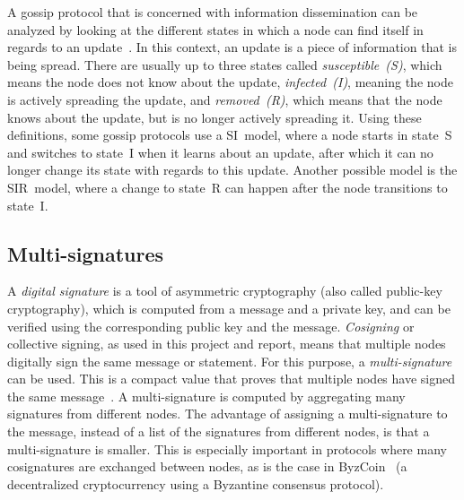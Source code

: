 A gossip protocol that is concerned with information dissemination can be analyzed by looking at the different states in which a node can find itself in regards to an update~\cite{Jela13}.
In this context, an update is a piece of information that is being spread. There are usually up to three states called \emph{susceptible~(S)}, which means the node does not know about the update, \emph{infected~(I)}, meaning the node is actively spreading the update, and \emph{removed~(R)}, which means that the node knows about the update, but is no longer actively spreading it.
Using these definitions, some gossip protocols use a SI~model, where a node starts in state~S and switches to state~I when it learns about an update, after which it can no longer change its state with regards to this update. Another possible model is the SIR~model, where a change to state~R can happen after the node transitions to state~I.

\subsection{Multi-signatures}

A \emph{digital signature} is a tool of asymmetric cryptography (also called public-key cryptography), which is computed from a message and a private key, and can be verified using the corresponding public key and the message.
\emph{Cosigning} or collective signing, as used in this project and report, means that multiple nodes digitally sign the same message or statement.
For this purpose, a \emph{multi-signature} can be used. This is a compact value that proves that multiple nodes have signed the same message~\cite{Boneh18}. A multi-signature is computed by aggregating many signatures from different nodes.
The advantage of assigning a multi-signature to the message, instead of a list of the signatures from different nodes, is that a multi-signature is smaller. This is especially important in protocols where many cosignatures are exchanged between nodes, as is the case in ByzCoin~\cite{Koko16} (a decentralized cryptocurrency using a Byzantine consensus protocol).

